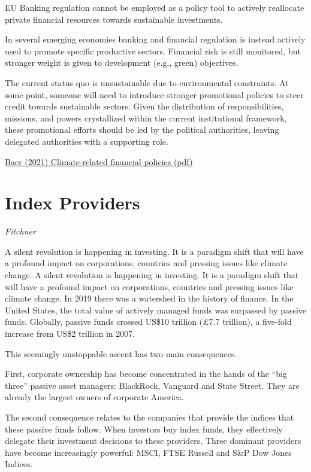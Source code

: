 \documentclass[
]{book}
\begin{document}
EU Banking regulation cannot be employed as a
policy tool to actively reallocate private financial resources towards sustainable investments.

In several emerging economies banking and financial regulation is instead
actively used to promote specific productive sectors.
Financial risk is still monitored, but stronger
weight is given to development (e.g., green) objectives.

The current status quo is unsustainable due to environmental constraints. At some
point, someone will need to introduce stronger promotional policies to steer credit towards
sustainable sectors. Given the distribution of responsibilities, missions, and powers crystallized
within the current institutional framework, these promotional efforts should be led by the
political authorities, leaving delegated authorities with a supporting role.

\href{pdf/Baer_2021_Institutional_Climate_Policy_Dynamics.pdf}{Baer (2021) Climate-related financial policies (pdf)}

\hypertarget{index-providers-1}{%
\chapter{Index Providers}\label{index-providers-1}}

\emph{Fitchner}

A silent revolution is happening in investing. It is a paradigm shift that will have a profound impact on corporations, countries and pressing issues like climate change.
A silent revolution is happening in investing. It is a paradigm shift that will have a profound impact on corporations, countries and pressing issues like climate change.
In 2019 there was a watershed in the history of finance. In the United States, the total value of actively managed funds was surpassed by passive funds. Globally, passive funds crossed US\$10 trillion (£7.7 trillion), a five-fold increase from US\$2 trillion in 2007.

This seemingly unstoppable ascent has two main consequences.

First, corporate ownership has become concentrated in the hands of the ``big three'' passive asset managers: BlackRock, Vanguard and State Street. They are already the largest owners of corporate America.

The second consequence relates to the companies that provide the indices that these passive funds follow. When investors buy index funds, they effectively delegate their investment decisions to these providers. Three dominant providers have become increasingly powerful: MSCI, FTSE Russell and S\&P Dow Jones Indices.
\end{document}
